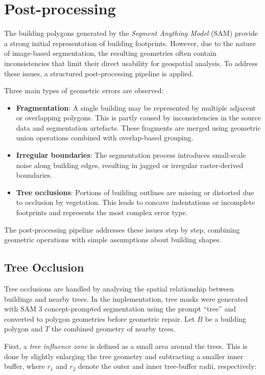\section{Post-processing}

The building polygons generated by the \textit{Segment Anything Model} (SAM) provide a strong initial representation of building footprints. However, due to the nature of image-based segmentation, the resulting geometries often contain inconsistencies that limit their direct usability for geospatial analysis. To address these issues, a structured post-processing pipeline is applied.

Three main types of geometric errors are observed:

\begin{itemize}
    \item \textbf{Fragmentation}: A single building may be represented by multiple adjacent or overlapping polygons. This is partly caused by inconsistencies in the source data and segmentation artefacts. These fragments are merged using geometric union operations combined with overlap-based grouping.
    \item \textbf{Irregular boundaries}: The segmentation process introduces small-scale noise along building edges, resulting in jagged or irregular raster-derived boundaries.
    \item \textbf{Tree occlusions}: Portions of building outlines are missing or distorted due to occlusion by vegetation. This leads to concave indentations or incomplete footprints and represents the most complex error type.
\end{itemize}

The post-processing pipeline addresses these issues step by step, combining geometric operations with simple assumptions about building shapes.

\subsection{Tree Occlusion}

Tree occlusions are handled by analysing the spatial relationship between buildings and nearby trees. In the implementation, tree masks were generated with SAM 3 concept-prompted segmentation using the prompt ``tree'' and converted to polygon geometries before geometric repair. Let \(B\) be a building polygon and \(T\) the combined geometry of nearby trees.

First, a \textit{tree influence zone} is defined as a small area around the trees. This is done by slightly enlarging the tree geometry and subtracting a smaller inner buffer, where \(r_1\) and \(r_2\) denote the outer and inner tree-buffer radii, respectively:

